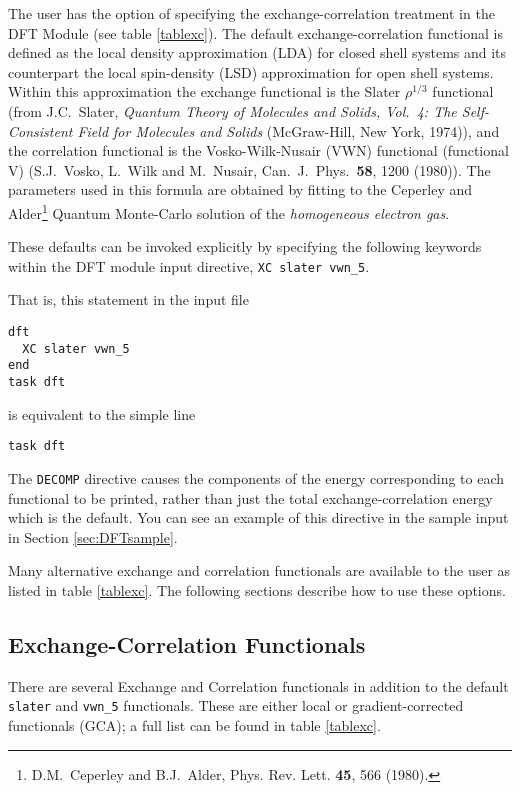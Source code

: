 The user has the option of specifying the exchange-correlation
treatment in the DFT Module (see table \ref{tablexc}).
  The default exchange-correlation
functional is defined as the local density approximation (LDA) for
closed shell systems and its counterpart the local spin-density (LSD)
approximation for open shell systems.  Within this approximation the
exchange functional is the Slater $\rho^{1/3}$ functional (from
J.C.~Slater, {\sl Quantum Theory of Molecules and Solids, Vol.~4: The
  Self-Consistent Field for Molecules and Solids} (McGraw-Hill, New
York, 1974)), and the correlation functional is the Vosko-Wilk-Nusair
(VWN) functional (functional V) (S.J.~Vosko, L.~Wilk and M.~Nusair,
Can.~J.~Phys.~{\bf 58}, 1200 (1980)).  The parameters used in this
formula are obtained by fitting to the Ceperley and
Alder\footnote{D.M.~Ceperley and B.J.~Alder, Phys. Rev. Lett. {\bf
    45}, 566 (1980).}
Quantum Monte-Carlo solution of the {\em
  homogeneous electron gas}.

These defaults can be invoked explicitly by specifying the following
keywords within the DFT module input directive, \verb+XC slater vwn_5+.


That is, this statement in the input file
\begin{verbatim}
dft
  XC slater vwn_5
end
task dft
\end{verbatim}

is equivalent to the simple line
\begin{verbatim}
task dft
\end{verbatim}


The \verb+DECOMP+ directive causes the components of the energy
corresponding to each functional to be printed, rather than just the
total exchange-correlation energy which is the default.  You can see
an example of this directive in the sample input in 
Section \ref{sec:DFTsample}.


Many alternative exchange and correlation functionals are available to
the user as listed in table \ref{tablexc}.  The following sections describe 
how to use these options.

\subsection{Exchange-Correlation Functionals}

There are several Exchange and Correlation functionals in addition to the 
default {\tt slater} and {\tt vwn\_5}
functionals.  These are either local or gradient-corrected functionals (GCA);
a full list can be found in table \ref{tablexc}. 

